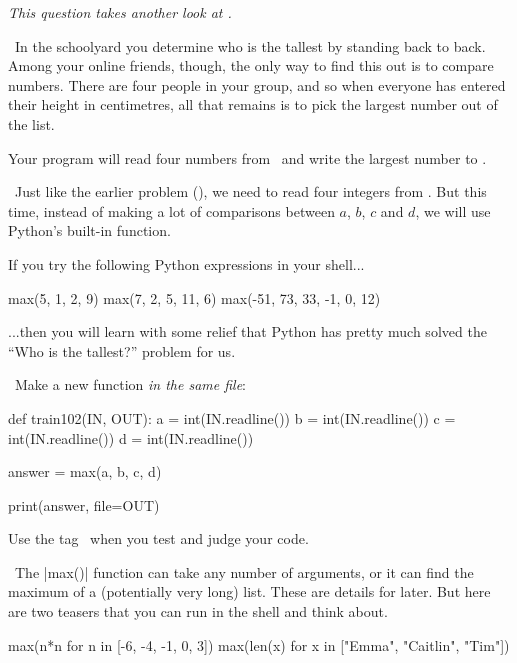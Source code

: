 
\emph{This question takes another look at .}

\Question\ In the schoolyard you determine who is the tallest by standing back to back.
Among your online friends, though, the only way to find this out is to compare numbers.
There are four people in your group, and so when everyone has entered their height in
centimetres, all that remains is to pick the largest number out of the list.

Your program will read four numbers from \IN\ and write the largest number to \OUT.

\Sample


\Scratch\ Just like the earlier problem (), we need to
read four integers from \IN. But this time, instead of making a lot of comparisons between
$a$, $b$, $c$ and $d$, we will use Python's built-in  function.

If you try the following Python expressions in your shell...

\begin{pythoncode}
    max(5, 1, 2, 9)
    max(7, 2, 5, 11, 6)
    max(-51, 73, 33, -1, 0, 12)
\end{pythoncode}

...then you will learn with some relief that Python has pretty much solved the ``Who is
the tallest?'' problem for us.

\Solution\ Make a new function \emph{in the same file}:

\begin{pythoncode}
    def train102(IN, OUT):
        a = int(IN.readline())
        b = int(IN.readline())
        c = int(IN.readline())
        d = int(IN.readline())

        answer = max(a, b, c, d)

        print(answer, file=OUT)
\end{pythoncode}

Use the tag \problemtagtt\ when you test and judge your code.

\Afterword\ The \pycode|max()| function can take any number of arguments, or it can find
the maximum of a (potentially very long) list. These are details for later. But here are
two teasers that you can run in the shell and think about.

\begin{pythoncode} 
  max(n*n for n in [-6, -4, -1, 0, 3])
  max(len(x) for x in ["Emma", "Caitlin", "Tim"])
\end{pythoncode}

